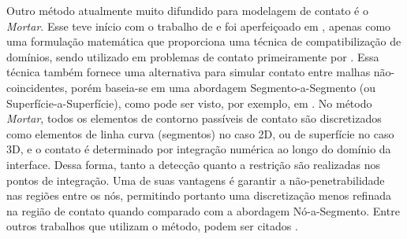 \documentclass[Tese.tex]{subfiles}
\begin{document}
Outro método atualmente muito difundido para modelagem de contato é o \textit{Mortar}. Esse teve início com o trabalho de  e foi aperfeiçoado em , apenas como uma formulação matemática que proporciona uma técnica de compatibilização de domínios, sendo utilizado em problemas de contato primeiramente por . Essa técnica também fornece uma alternativa para simular contato entre malhas não-coincidentes, porém baseia-se em uma abordagem Segmento-a-Segmento (ou Superfície-a-Superfície), como pode ser visto, por exemplo, em . No método \textit{Mortar}, todos os elementos de contorno passíveis de contato são discretizados como elementos de linha curva (segmentos) no caso 2D, ou de superfície no caso 3D, e o contato é determinado por integração numérica ao longo do domínio da interface. Dessa forma, tanto a detecção quanto a restrição são realizadas nos pontos de integração. Uma de suas vantagens é garantir a não-penetrabilidade nas regiões entre os nós, permitindo portanto uma discretização menos refinada na região de contato quando comparado com a abordagem Nó-a-Segmento. Entre outros trabalhos que utilizam o método, podem ser citados .



\end{document}
